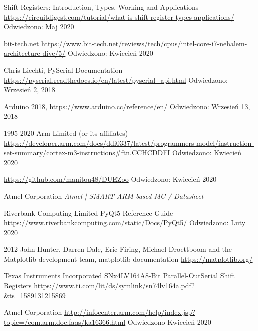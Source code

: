 \documentclass[a4paper,12pt]{article}
\begin{document}
\begin{thebibliography}{99}
        Shift Registers: Introduction, Types, Working and Applications
        \url{https://circuitdigest.com/tutorial/what-is-shift-register-types-applications/}
        Odwiedzono: Maj 2020

        bit-tech.net
        \url{https://www.bit-tech.net/reviews/tech/cpus/intel-core-i7-nehalem-architecture-dive/5/}
        Odwiedzono:
        Kwiecień 2020

        Chris Liechti,	
        PySerial Documentation
	\url{https://pyserial.readthedocs.io/en/latest/pyserial_api.html}
        Odwiedzono: Wrzesień 2, 2018
        
	 Arduino 2018,
	 \url{https://www.arduino.cc/reference/en/}
        Odwiedzono: Wrzesień 13, 2018	 
        
        1995-2020 Arm Limited (or its affiliates)
        \url{https://developer.arm.com/docs/ddi0337/latest/programmers-model/instruction-set-summary/cortex-m3-instructions#ftn.CCHCDDFI}
        Odwiedzono: Kwiecień 2020

        \url{https://github.com/manitou48/DUEZoo}
        Odwiedzono: Kwiecień 2020

        Atmel Corporation
        \textit{Atmel | SMART ARM-based MC  / Datasheet}

        Riverbank Computing Limited
        PyQt5 Reference Guide
        \url{https://www.riverbankcomputing.com/static/Docs/PyQt5/}
        Odwiedzono: Luty 2020

        2012 John Hunter, Darren Dale, Eric Firing, Michael Droettboom and the Matplotlib development team,
        matplotlib documentation
        \url{https://matplotlib.org/}

        Texas Instruments Incorporated
        SNx4LV164A8-Bit Parallel-OutSerial Shift Registers
        \url{https://www.ti.com/lit/ds/symlink/sn74lv164a.pdf?&ts=1589131215869}

        Atmel Corporation
        \url{http://infocenter.arm.com/help/index.jsp?topic=/com.arm.doc.faqs/ka16366.html}
        Odwiedzono Kwiecień 2020

\end{thebibliography}
\end{document}
